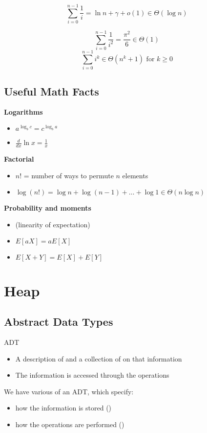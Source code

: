 \documentclass[letterpaper, 12pt]{article}
\newcommand{\red}[1]{{\color{red}{#1}}}
\begin{document}
    \red{Harmonic sequence}
    $$\sum_{i=0}^{n-1}\frac{1}{i} = \ln n + \gamma + o(1) \in \Theta(\log n)$$

    \red{A few more}
    $$\sum_{i=0}^{n-1}\frac{1}{i^2} = \frac{\pi^2}{6} \in \Theta(1)$$
    $$\sum_{i=0}^{n-1}i^k \in \Theta(n^k+1) \text{ for } k \geq 0$$
    \pagebreak

    \subsection{Useful Math Facts}
    \textbf{Logarithms}\\
    \begin{itemize}
        \item $a^{\log_{b}c} = c^{\log_{b}a}$
        \item $\frac{d}{dx}\ln x = \frac{1}{x}$
    \end{itemize}

    \textbf{Factorial}\\
    \begin{itemize}
        \item $n!$ = number of ways to permute $n$ elements
        \item $\log(n!) = \log n + \log (n-1) + \dots + \log 1 \in \Theta(n\log n)$
    \end{itemize}

    \textbf{Probability and moments}\\
    \begin{itemize}
        \item (linearity of expectation)
        \item $E[aX] = aE[X]$
        \item $E[X+Y] = E[X] + E[Y]$ 
    \end{itemize}
    \pagebreak

    \section{Heap}
    \subsection{Abstract Data Types}
    ADT\\
    \begin{itemize}
        \item A description of \red{information} and a collection of \red{operations} on that information
        \item The information is accessed \red{only} through the operations
    \end{itemize}
    We have various \red{realizations} of an ADT, which specify:
    \begin{itemize}
        \item how the information is stored (\red{Data Structure})
        \item how the operations are performed (\red{Algorithms})
    \end{itemize}
\end{document}
